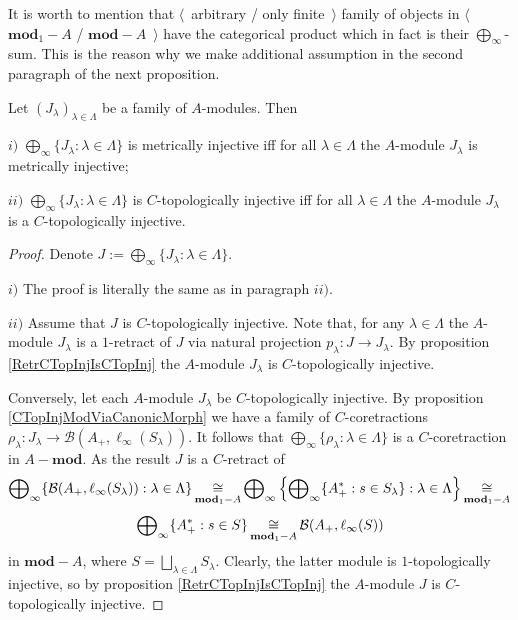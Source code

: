 It is worth to mention that $\langle$~arbitrary / only finite~$\rangle$ family of objects in $\langle$~$\mathbf{mod}_1-A$ / $\mathbf{mod}-A$~$\rangle$ have the categorical product which in fact is their $\bigoplus_\infty$-sum. This is the reason why we make additional assumption in the second paragraph of the next proposition.

\begin{proposition}\label{MetTopInjModProd} Let $(J_\lambda)_{\lambda\in\Lambda}$ be a family of $A$-modules. Then 

$i)$ $\bigoplus_\infty\{J_\lambda:\lambda\in\Lambda\}$ is metrically injective iff for all $\lambda\in\Lambda$ the $A$-module $J_\lambda$ is metrically injective;

$ii)$ $\bigoplus_\infty\{J_\lambda:\lambda\in\Lambda\}$ is $C$-topologically injective iff for all $\lambda\in\Lambda$ the $A$-module $J_\lambda$ is a $C$-topologically injective.
\end{proposition}
\begin{proof} Denote $J:=\bigoplus_\infty\{J_\lambda:\lambda\in\Lambda\}$.

$i)$ The proof is literally the same as in paragraph $ii)$.

$ii)$ Assume that $J$ is $C$-topologically injective. Note that, for any $\lambda\in\Lambda$ the $A$-module $J_\lambda$ is a $1$-retract of $J$ via natural projection $p_\lambda:J\to J_\lambda$. By proposition \ref{RetrCTopInjIsCTopInj} the $A$-module $J_\lambda$ is $C$-topologically injective.

Conversely, let each $A$-module $J_\lambda$ be $C$-topologically injective. By proposition \ref{CTopInjModViaCanonicMorph} we have a family of $C$-coretractions $\rho_\lambda:J_\lambda\to\mathcal{B}(A_+,\ell_\infty(S_\lambda))$. It follows that $\bigoplus_\infty\{\rho_\lambda:\lambda\in\Lambda\}$ is a $C$-coretraction in $A-\mathbf{mod}$. As the result $J$ is a $C$-retract of 
$$
\bigoplus\nolimits_\infty\{\mathcal{B}(A_+,\ell_\infty(S_\lambda)):\lambda\in\Lambda\}
\mathop{\mathbin{\cong}}\limits_{\mathbf{mod}_1-A}
\bigoplus\nolimits_\infty\left\{\bigoplus\nolimits_\infty\{ A_+^*:s\in S_\lambda\}:\lambda\in\Lambda\right\}
\mathop{\mathbin{\cong}}\limits_{\mathbf{mod}_1-A}
$$
$$
\bigoplus\nolimits_\infty\{A_+^*:s\in S\}
\mathop{\mathbin{\cong}}\limits_{\mathbf{mod}_1-A}
\mathcal{B}(A_+,\ell_\infty(S))
$$
in $\mathbf{mod}-A$, where $S=\bigsqcup_{\lambda\in\Lambda}S_\lambda$. Clearly, the latter module is $1$-topologically injective, so by proposition \ref{RetrCTopInjIsCTopInj} the $A$-module $J$ is $C$-topologically injective.
\end{proof}

